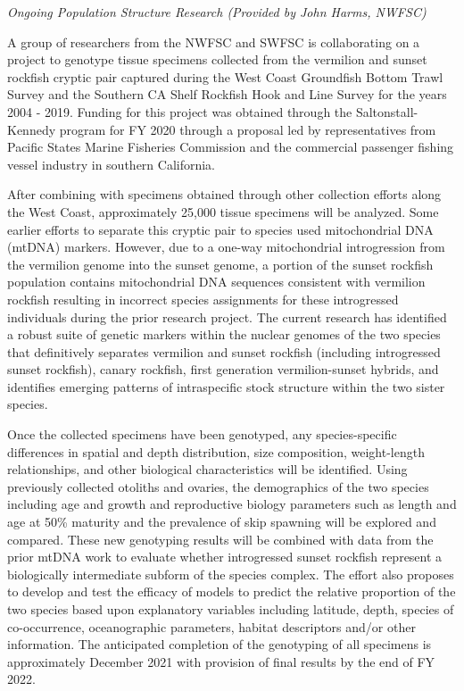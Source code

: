\documentclass[
  english,
  a4paper,
]{article}
\begin{document}
\emph{Ongoing Population Structure Research (Provided by John Harms, NWFSC)}

A group of researchers from the NWFSC and SWFSC is collaborating on a project to
genotype tissue specimens collected from the vermilion and sunset rockfish cryptic
pair captured during the West Coast Groundfish Bottom Trawl Survey and the Southern
CA Shelf Rockfish Hook and Line Survey for the years 2004 - 2019. Funding for this
project was obtained through the Saltonstall-Kennedy program for FY 2020 through a
proposal led by representatives from Pacific States Marine Fisheries Commission and
the commercial passenger fishing vessel industry in southern California.

After combining with specimens obtained through other collection efforts along
the West Coast, approximately 25,000 tissue specimens will be analyzed. Some
earlier efforts to separate this cryptic pair to species used mitochondrial DNA
(mtDNA) markers. However, due to a one-way mitochondrial introgression from
the vermilion genome into the sunset genome, a portion of the sunset rockfish
population contains mitochondrial DNA sequences consistent with vermilion rockfish
resulting in incorrect species assignments for these introgressed individuals
during the prior research project. The current research has identified a robust
suite of genetic markers within the nuclear genomes of the two species that
definitively separates vermilion and sunset rockfish (including introgressed
sunset rockfish), canary rockfish, first generation vermilion-sunset hybrids,
and identifies emerging patterns of intraspecific stock structure within the
two sister species.

Once the collected specimens have been genotyped, any species-specific differences
in spatial and depth distribution, size composition, weight-length relationships,
and other biological characteristics will be identified. Using previously
collected otoliths and ovaries, the demographics of the two species including
age and growth and reproductive biology parameters such as length and age at
50\% maturity and the prevalence of skip spawning will be explored and compared.
These new genotyping results will be combined with data from the prior mtDNA
work to evaluate whether introgressed sunset rockfish represent a biologically
intermediate subform of the species complex. The effort also proposes to develop
and test the efficacy of models to predict the relative proportion of the two
species based upon explanatory variables including latitude, depth, species of
co-occurrence, oceanographic parameters, habitat descriptors and/or other
information. The anticipated completion of the genotyping of all specimens
is approximately December 2021 with provision of final results by the end of FY 2022.
\end{document}
